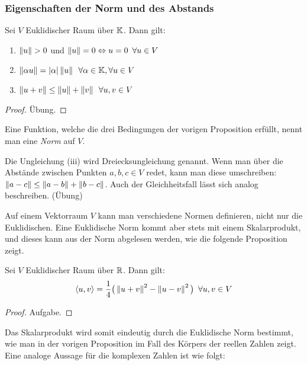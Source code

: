\subsubsection{Eigenschaften der Norm und des Abstands}
\label{sec:7_1_3}

\begin{propn}
	Sei $ V $ Euklidischer Raum über $ \mathbb K $. Dann gilt:
	\begin{enumerate}
		\item
			$ \left\| u \right\| > 0 $ und $ \left\| u \right\| = 0 \Leftrightarrow u = 0 \enspace \forall u \in V $
		\item
			$ \left\| \alpha u \right\| = \left| \alpha \right| \left\| u \right\| \enspace \forall \alpha \in \mathbb K, \forall u \in V $
		\item
			$ \left\| u+v \right\| \leq \left\| u \right\| + \left\| v \right\| \enspace \forall u,v \in V $
	\end{enumerate}
\end{propn}
\begin{proof}
	Übung.
\end{proof}

Eine Funktion, welche die drei Bedingungen der vorigen Proposition erfüllt, nennt man eine \emph{Norm} auf $V$. 

\noindent Die Ungleichung (iii) wird Dreiecksungleichung genannt. Wenn man über die Abstände zwischen Punkten $ a,b,c \in V $ redet, kann man diese umschreiben: $ \left\| a-c \right\| \leq \left\| a-b \right\| + \left\| b-c \right\| $. Auch der Gleichheitsfall lässt sich analog beschreiben. (Übung)

Auf einem Vektorraum $V$ kann man verschiedene Normen definieren, nicht nur die Euklidischen. Eine Euklidische Norm kommt aber stets mit einem Skalarprodukt, und dieses kann aus der Norm abgelesen werden, wie die folgende Proposition zeigt. 

\begin{propn}
	Sei $ V $ Euklidischer Raum über $ \mathbb R $. Dann gilt: 
	\begin{equation}
		\left\langle u,v \right\rangle = \frac{1}{4} \big( \left\| u+v \right\|^2 - \left\| u-v \right\|^2 \big) \enspace \forall u,v \in V
	\end{equation}
\end{propn}
\begin{proof}
	Aufgabe.
\end{proof}
	
	
Das Skalarprodukt wird somit eindeutig durch die Euklidische Norm bestimmt, wie man in der vorigen Proposition im Fall des Körpers der reellen Zahlen zeigt. Eine analoge Aussage für die komplexen Zahlen ist wie folgt: 

